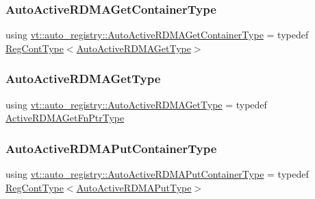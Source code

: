 \subsubsection{\texorpdfstring{Auto\+Active\+R\+D\+M\+A\+Get\+Container\+Type}{AutoActiveRDMAGetContainerType}}
{\footnotesize\ttfamily using \hyperlink{namespacevt_1_1auto__registry_a85bc3ac8c35caf2f304c24a73a07f1c6}{vt\+::auto\+\_\+registry\+::\+Auto\+Active\+R\+D\+M\+A\+Get\+Container\+Type} = typedef \hyperlink{namespacevt_1_1auto__registry_a988a4943e4c8fe82b56f5b13bddceb2b}{Reg\+Cont\+Type}$<$\hyperlink{namespacevt_1_1auto__registry_a039813f93a5804c77ae612e0318fb335}{Auto\+Active\+R\+D\+M\+A\+Get\+Type}$>$}

\mbox{\label{namespacevt_1_1auto__registry_a039813f93a5804c77ae612e0318fb335}} 
\subsubsection{\texorpdfstring{Auto\+Active\+R\+D\+M\+A\+Get\+Type}{AutoActiveRDMAGetType}}
{\footnotesize\ttfamily using \hyperlink{namespacevt_1_1auto__registry_a039813f93a5804c77ae612e0318fb335}{vt\+::auto\+\_\+registry\+::\+Auto\+Active\+R\+D\+M\+A\+Get\+Type} = typedef \hyperlink{namespacevt_ae4fbf97da623bfcd09ee8379de756257}{Active\+R\+D\+M\+A\+Get\+Fn\+Ptr\+Type}}

\mbox{\label{namespacevt_1_1auto__registry_a7051002e8986239f9c5f986384ebec66}} 
\subsubsection{\texorpdfstring{Auto\+Active\+R\+D\+M\+A\+Put\+Container\+Type}{AutoActiveRDMAPutContainerType}}
{\footnotesize\ttfamily using \hyperlink{namespacevt_1_1auto__registry_a7051002e8986239f9c5f986384ebec66}{vt\+::auto\+\_\+registry\+::\+Auto\+Active\+R\+D\+M\+A\+Put\+Container\+Type} = typedef \hyperlink{namespacevt_1_1auto__registry_a988a4943e4c8fe82b56f5b13bddceb2b}{Reg\+Cont\+Type}$<$\hyperlink{namespacevt_1_1auto__registry_a1f67d3efa37b61040b56258ca59df088}{Auto\+Active\+R\+D\+M\+A\+Put\+Type}$>$}

